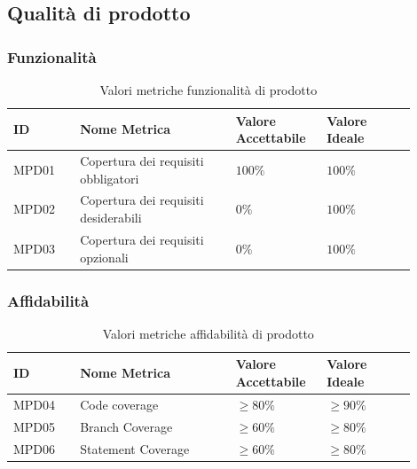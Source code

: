 \documentclass[a4paper,12pt]{article}
\begin{document}
        \subsection{Qualità di prodotto}
            \subsubsection{Funzionalità}
                \begin{longtable}{|M{0.15\linewidth}|M{0.35\linewidth}|M{0.2\linewidth}|M{0.2\linewidth}|}

                    \caption{Valori metriche funzionalità di prodotto} \\
                    \hline
                    \textbf{ID} & \textbf{Nome Metrica} & \textbf{Valore Accettabile} & \textbf{Valore Ideale} \\
                    \hline
                    \endhead

                    MPD01 & Copertura dei requisiti obbligatori & $100\%$ & $100\%$ \\
                    \hline

                    MPD02 & Copertura dei requisiti desiderabili & $0\%$ & $100\%$ \\
                    \hline

                    MPD03 & Copertura dei requisiti opzionali & $0\%$ & $100\%$ \\
                    \hline

                \end{longtable}

            \subsubsection{Affidabilità}
            \begin{longtable}{|M{0.15\linewidth}|M{0.35\linewidth}|M{0.2\linewidth}|M{0.2\linewidth}|}

                \caption{Valori metriche affidabilità di prodotto} \\
                \hline
                \textbf{ID} & \textbf{Nome Metrica} & \textbf{Valore Accettabile} & \textbf{Valore Ideale} \\
                \hline
                \endhead

                    MPD04 & Code coverage & $\ge80\%$ & $\ge90\%$ \\
                    \hline

                    MPD05 & Branch Coverage & $\ge60\%$ & $\ge80\%$ \\
                    \hline

                    MPD06 & Statement Coverage & $\ge60\%$ & $\ge80\%$ \\
                    \hline

            \end{longtable}
\end{document}

